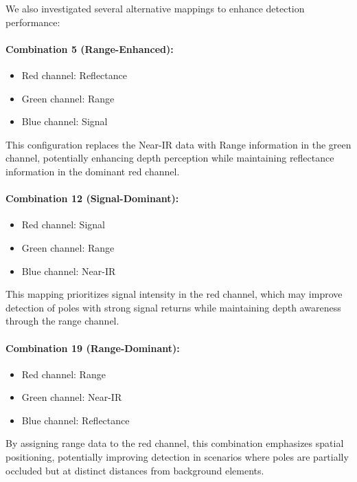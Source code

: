 \documentclass[11pt]{article}
\begin{document}
We also investigated several alternative mappings to enhance detection performance:

\paragraph{Combination 5 (Range-Enhanced):}
\begin{itemize}
    \item Red channel: Reflectance
    \item Green channel: Range
    \item Blue channel: Signal
\end{itemize}
This configuration replaces the Near-IR data with Range information in the green channel, potentially enhancing depth perception while maintaining reflectance information in the dominant red channel.

\paragraph{Combination 12 (Signal-Dominant):}
\begin{itemize}
    \item Red channel: Signal
    \item Green channel: Range
    \item Blue channel: Near-IR
\end{itemize}
This mapping prioritizes signal intensity in the red channel, which may improve detection of poles with strong signal returns while maintaining depth awareness through the range channel.

\paragraph{Combination 19 (Range-Dominant):}
\begin{itemize}
    \item Red channel: Range
    \item Green channel: Near-IR
    \item Blue channel: Reflectance
\end{itemize}
By assigning range data to the red channel, this combination emphasizes spatial positioning, potentially improving detection in scenarios where poles are partially occluded but at distinct distances from background elements.
\end{document}
